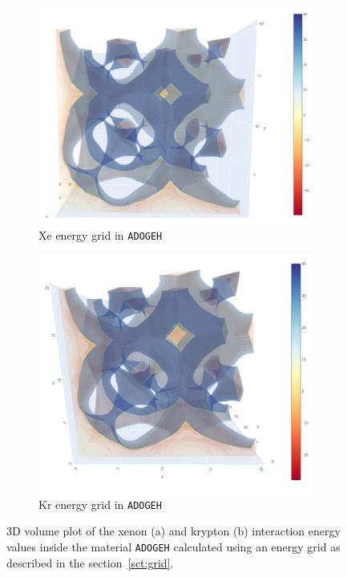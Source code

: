 \documentclass[main]{subfiles}
\begin{document}
\begin{figure}[ht]
  \centering
  \begin{subfigure}[b]{0.45\textwidth}
    \centering
    \includegraphics[width=\textwidth]{figures/5-diffusion/viz/ADOGEH_Xe.jpg}
    \caption{Xe energy grid in \texttt{ADOGEH}}\label{fgr:ADOGEH_Xe}
  \end{subfigure}
  \hspace{1cm}
  \begin{subfigure}[b]{0.45\textwidth}
    \centering
    \includegraphics[width=\textwidth]{figures/5-diffusion/viz/ADOGEH_Kr.jpg}
    \caption{Kr energy grid in \texttt{ADOGEH}}\label{fgr:ADOGEH_Kr}
  \end{subfigure}
  \caption{3D volume plot of the xenon (a) and krypton (b) interaction energy values inside the material \texttt{ADOGEH}\autocite{Peikert_2012} calculated using an energy grid as described in the section~\ref{sct:grid}. }\label{fgr:ADOGEH}
\end{figure}
\end{document}
